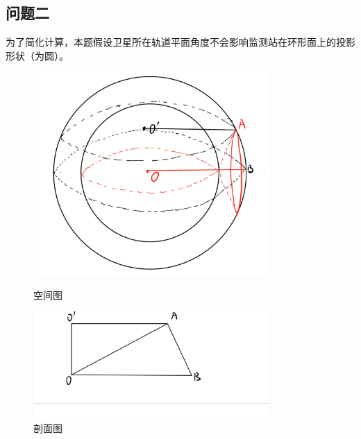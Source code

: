 \documentclass[UTF8]{ctexart}
\begin{document}
        \subsection{问题二}
        为了简化计算，本题假设卫星所在轨道平面角度不会影响监测站在环形面上的投影形状（为圆）。
        \begin{figure}[H]
            \centering %
            \begin{minipage}[b]{0.45\textwidth} %
            \centering %
            \includegraphics[width=0.8\textwidth]{第二问1} %
            \caption{空间图}
            \label{Fig.1}
            \end{minipage}
            \begin{minipage}[b]{0.45\textwidth} %
            \centering %
            \includegraphics[width=0.8\textwidth]{第二问2}%
            \caption{剖面图}
            \label{Fig.2}
            \end{minipage}
        \end{figure}
\end{document}
